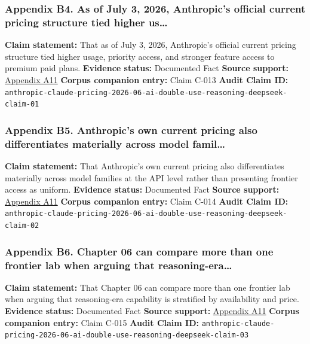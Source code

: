 \documentclass[
  american,
  11pt,
  letterpaper,
]{article}
\begin{document}
\subsubsection{Appendix B4. As of July 3, 2026, Anthropic's official
current pricing structure tied higher
us\ldots{}}\label{appendix-b4-as-of-july-3-2026-anthropic-s-official-current-pricing-structure-tied-higher-us}

\textbf{Claim statement:} That as of July 3, 2026, Anthropic's official
current pricing structure tied higher usage, priority access, and
stronger feature access to premium paid plans. \textbf{Evidence status:}
Documented Fact \textbf{Source support:}
\hyperref[appendix-a11-plans-pricing-claude-by-anthropic]{Appendix A11}
\textbf{Corpus companion entry:} Claim C-013 \textbf{Audit Claim ID:}
\texttt{anthropic-claude-pricing-2026-06-ai-double-use-reasoning-deepseek-claim-01}

\subsubsection{Appendix B5. Anthropic's own current pricing also
differentiates materially across model
famil\ldots{}}\label{appendix-b5-anthropic-s-own-current-pricing-also-differentiates-materially-across-model-famil}

\textbf{Claim statement:} That Anthropic's own current pricing also
differentiates materially across model families at the API level rather
than presenting frontier access as uniform. \textbf{Evidence status:}
Documented Fact \textbf{Source support:}
\hyperref[appendix-a11-plans-pricing-claude-by-anthropic]{Appendix A11}
\textbf{Corpus companion entry:} Claim C-014 \textbf{Audit Claim ID:}
\texttt{anthropic-claude-pricing-2026-06-ai-double-use-reasoning-deepseek-claim-02}

\subsubsection{Appendix B6. Chapter 06 can compare more than one
frontier lab when arguing that
reasoning-era\ldots{}}\label{appendix-b6-chapter-06-can-compare-more-than-one-frontier-lab-when-arguing-that-reasoning-era}

\textbf{Claim statement:} That Chapter 06 can compare more than one
frontier lab when arguing that reasoning-era capability is stratified by
availability and price. \textbf{Evidence status:} Documented Fact
\textbf{Source support:}
\hyperref[appendix-a11-plans-pricing-claude-by-anthropic]{Appendix A11}
\textbf{Corpus companion entry:} Claim C-015 \textbf{Audit Claim ID:}
\texttt{anthropic-claude-pricing-2026-06-ai-double-use-reasoning-deepseek-claim-03}
\end{document}
